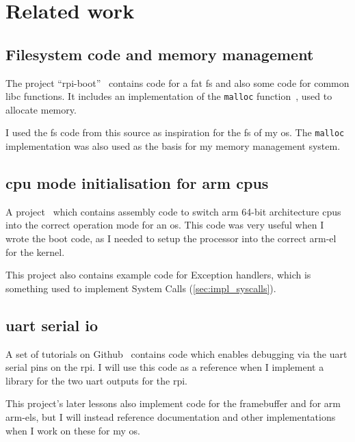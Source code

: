 \documentclass{article}
\begin{document}
\section{Related work}
\label{sec:related-works}
\begin{refsection}

\subsection{Filesystem code and memory management}
The project ``rpi-boot''~\cite{rpi-boot-gh} contains code for a \gls{fat}
\gls{fs} and also some code for common libc functions. It includes an
implementation of the \texttt{malloc} function~\cite{dlmalloc}, used to
allocate memory.

I used the \gls{fs} code from this source as inspiration for the \gls{fs} of my
\gls{os}. The \texttt{malloc} implementation was also used as the basis for my
memory management system.

\subsection{\texorpdfstring{\gls{cpu}}{CPU} mode initialisation for
\texorpdfstring{\gls{arm} \glspl{cpu}}{arm CPUs}}
A project~\cite{raspberry-pi-os-gh} which contains assembly code to switch
\gls{arm} 64-bit architecture \glspl{cpu} into the correct operation mode for
an \gls{os}. This code was very useful when I wrote the boot code, as I needed
to setup the processor into the correct \gls{arm-el} for the kernel.

This project also contains example code for Exception handlers, which is
something used to implement System Calls (\autoref{sec:impl_syscalls}).

\subsection{\texorpdfstring{\gls{uart}}{UART} serial
\texorpdfstring{\gls{io}}{IO}}
A set of tutorials on Github~\cite{raspi3-tutorial-gh} contains code which
enables debugging via the \gls{uart} serial pins on the \gls{rpi}. I will use
this code as a reference when I implement a library for the two \gls{uart}
outputs for the \gls{rpi}.

This project's later lessons also implement code for the framebuffer and for
\gls{arm} \glspl{arm-el}, but I will instead reference documentation and other
implementations when I work on these for my \gls{os}.


\end{refsection}
\end{document}
